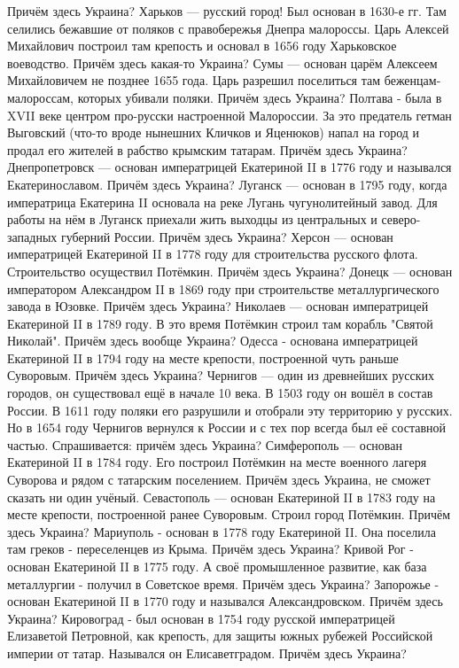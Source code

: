Причём здесь Украина?
Харьков — русский город! Был основан в 1630-е гг. Там селились бежавшие от поляков с правобережья Днепра малороссы. Царь Алексей Михайлович построил там крепость и основал в 1656 году Харьковское воеводство. Причём здесь какая-то Украина?
Сумы — основан царём Алексеем Михайловичем не позднее 1655 года. Царь разрешил поселиться там беженцам-малороссам, которых убивали поляки. Причём здесь Украина?
Полтава - была в XVII веке центром про-русски настроенной Малороссии. За это предатель гетман Выговский (что-то вроде нынешних Кличков и Яценюков) напал на город и продал его жителей в рабство крымским татарам. Причём здесь Украина?
Днепропетровск — основан императрицей Екатериной II в 1776 году и назывался Екатеринославом. Причём здесь Украина?
Луганск — основан в 1795 году, когда императрица Екатерина II основала на реке Лугань чугунолитейный завод. Для работы на нём в Луганск приехали жить выходцы из центральных и северо-западных губерний России. Причём здесь Украина?
Херсон — основан императрицей Екатериной II в 1778 году для строительства русского флота. Строительство осуществил Потёмкин. Причём здесь Украина?
Донецк — основан императором Александром II в 1869 году при строительстве металлургического завода в Юзовке. Причём здесь Украина?
Николаев — основан императрицей Екатериной II в 1789 году. В это время Потёмкин строил там корабль "Святой Николай". Причём здесь вообще Украина?
Одесса - основана императрицей Екатериной II в 1794 году на месте крепости, построенной чуть раньше Суворовым. Причём здесь Украина?
Чернигов — один из древнейших русских городов, он существовал ещё в начале 10 века. В 1503 году он вошёл в состав России. В 1611 году поляки его разрушили и отобрали эту территорию у русских. Но в 1654 году Чернигов вернулся к России и с тех пор всегда был её составной частью. Спрашивается: причём здесь Украина?
Симферополь — основан Екатериной II в 1784 году. Его построил Потёмкин на месте военного лагеря Суворова и рядом с татарским поселением. Причём здесь Украина, не сможет сказать ни один учёный.
Севастополь — основан Екатериной II в 1783 году на месте крепости, построенной ранее Суворовым. Строил город Потёмкин. Причём здесь Украина?
Мариуполь - основан в 1778 году Екатериной II. Она поселила там греков - переселенцев из Крыма. Причём здесь Украина?
Кривой Рог - основан Екатериной II в 1775 году. А своё промышленное развитие, как база металлургии - получил в Советское время. Причём здесь Украина?
Запорожье - основан Екатериной II в 1770 году и назывался Александровском. Причём здесь Украина?
Кировоград - был основан в 1754 году русской императрицей Елизаветой Петровной, как крепость, для защиты южных рубежей Российской империи от татар. Назывался он Елисаветградом. Причём здесь Украина?

